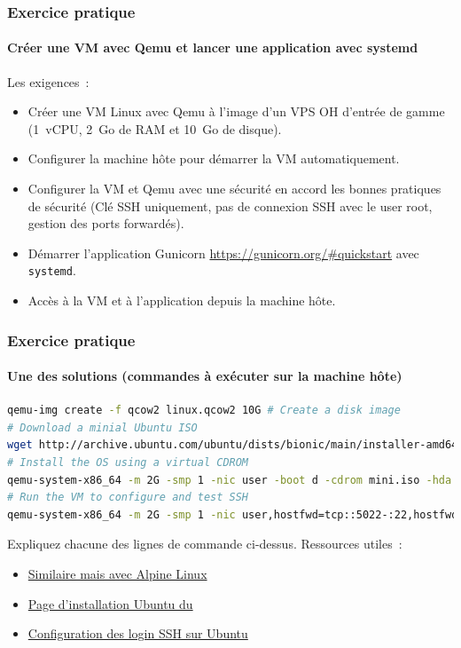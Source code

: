\documentclass{beamer}
\begin{document}
    \begin{frame}
        \transdissolve
        \frametitle{Exercice pratique}
        \framesubtitle{Créer une VM avec Qemu et lancer une application avec systemd}
        Les exigences~:
        \begin{itemize}
            \item Créer une VM Linux avec Qemu à l'image d'un VPS OH d'entrée de gamme (1~vCPU, 2~Go de RAM et 10~Go de disque).
            \item Configurer la machine hôte pour démarrer la VM automatiquement.
            \item Configurer la VM et Qemu avec une sécurité en accord les bonnes pratiques de sécurité (Clé SSH uniquement, pas de connexion SSH avec le user root, gestion des ports forwardés).
            \item Démarrer l'application Gunicorn  \url{https://gunicorn.org/\#quickstart} avec \lstinline{systemd}.
            \item Accès à la VM et à l'application depuis la machine hôte.
        \end{itemize}
    \end{frame}

    \begin{frame}[fragile]
        \transdissolve
        \frametitle{Exercice pratique}
        \framesubtitle{Une des solutions (commandes à exécuter sur la machine hôte)}
        \begin{lstlisting}[language=bash]
qemu-img create -f qcow2 linux.qcow2 10G # Create a disk image
# Download a minial Ubuntu ISO
wget http://archive.ubuntu.com/ubuntu/dists/bionic/main/installer-amd64/current/images/netboot/mini.iso
# Install the OS using a virtual CDROM
qemu-system-x86_64 -m 2G -smp 1 -nic user -boot d -cdrom mini.iso -hda linux.qcow2 -k fr -enable-kvm
# Run the VM to configure and test SSH
qemu-system-x86_64 -m 2G -smp 1 -nic user,hostfwd=tcp::5022-:22,hostfwd=tcp::5080-:80 -display none -hda linux.qcow2 -k fr -enable-kvm
        \end{lstlisting}
        Expliquez chacune des lignes de commande ci-dessus.
        \bigbreak
        Ressources utiles~:
        \begin{itemize}
            \item \href{https://wiki.alpinelinux.org/wiki/Install_Alpine_in_QEMU}{Similaire mais avec Alpine Linux}
            \item \href{https://help.ubuntu.com/community/Installation/MinimalCD\#A64-bit_PC_.28amd64.2C_x86_64.29_.28Recommended.29}{Page d'installation Ubuntu du  }
            \item \href{https://phoenixnap.com/kb/generate-setup-ssh-key-ubuntu}{Configuration des login SSH sur Ubuntu}
        \end{itemize}
    \end{frame}
\end{document}
